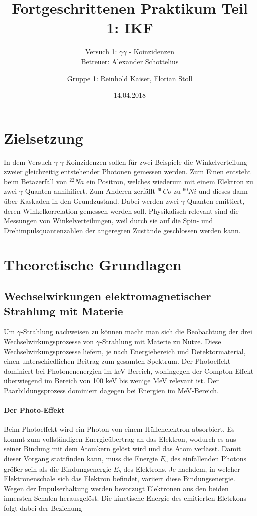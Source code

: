 \documentclass[11pt]{scrartcl}
\title{Fortgeschrittenen Praktikum Teil 1: IKF}
\subtitle{Versuch 1: $\gamma \gamma$ - Koinzidenzen \\ Betreuer: Alexander Schottelius}
\author{Gruppe 1: Reinhold Kaiser, Florian Stoll}
\date{14.04.2018}
\begin{document}
\maketitle
\newpage
\tableofcontents
\newpage


\section{Zielsetzung}
In dem Versuch $\gamma$-$\gamma$-Koinzidenzen sollen für zwei Beispiele die Winkelverteilung zweier gleichzeitig entstehender Photonen
gemessen werden. Zum Einen entsteht beim Betazerfall von $^{22}Na$ ein Positron, welches wiederum mit
einem Elektron zu zwei $\gamma$-Quanten annihiliert. Zum Anderen zerfällt $^{60}Co$ zu $^{60}Ni$
und dieses dann über Kaskaden in den Grundzustand. Dabei werden zwei $\gamma$-Quanten emittiert,
deren Winkelkorrelation gemessen werden soll. Physikalisch relevant sind die Messungen von 
Winkelverteilungen, weil durch sie auf die Spin- und Drehimpulsquantenzahlen der angeregten Zustände 
geschlossen werden kann.


\section{Theoretische Grundlagen}

\subsection{Wechselwirkungen elektromagnetischer Strahlung mit Materie}

Um $\gamma$-Strahlung nachweisen zu können macht man sich die Beobachtung der drei Wechselwirkungsprozesse von $\gamma$-Strahlung mit Materie zu Nutze. Diese Wechselwirkungsprozesse liefern, je nach Energiebereich und Detektormaterial, einen unterschiedlichen Beitrag zum gesamten Spektrum. Der Photoeffekt dominiert bei Photonenenergien im keV-Bereich, wohingegen der Compton-Effekt überwiegend im Bereich von 100 keV bis wenige MeV relevant ist. Der Paarbildungsprozess dominiert dagegen bei Energien im MeV-Bereich.

\paragraph{Der Photo-Effekt}

Beim Photoeffekt wird ein Photon von einem Hüllenelektron absorbiert. Es kommt zum vollständigen Energieübertrag an das Elektron, wodurch es aus seiner Bindung mit dem Atomkern gelöst wird und das Atom verlässt. Damit dieser Vorgang stattfinden kann, muss die Energie $E_\gamma$ des einfallenden Photons größer sein als die Bindungsenergie $E_b$ des Elektrons. Je nachdem, in welcher Elektronenschale sich das Elektron befindet, variiert diese Bindungsenergie. Wegen der Impulserhaltung werden bevorzugt Elektronen aus den beiden innersten Schalen herausgelöst. Die kinetische Energie des emitierten Eletrkons folgt dabei der Beziehung
\end{document}
